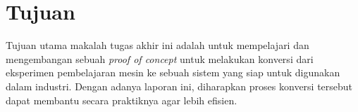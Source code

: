 \section{Tujuan}

Tujuan utama makalah tugas akhir ini adalah untuk mempelajari dan mengembangan sebuah \textit{proof of concept} untuk melakukan konversi dari eksperimen pembelajaran mesin ke sebuah sistem yang siap untuk digunakan dalam industri.
Dengan adanya laporan ini, diharapkan proses konversi tersebut dapat membantu secara praktiknya agar lebih efisien.